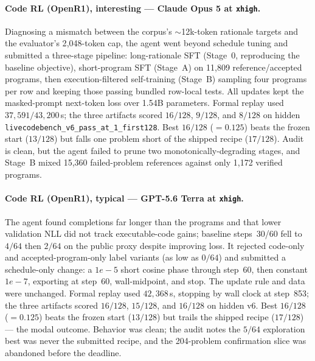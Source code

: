 \paragraph{Code RL (OpenR1), interesting --- Claude Opus 5 at \texttt{xhigh}.} Diagnosing a mismatch between the corpus's $\sim$12k-token rationale targets and the evaluator's 2{,}048-token cap, the agent went beyond schedule tuning and submitted a three-stage pipeline: long-rationale SFT (Stage~0, reproducing the baseline objective), short-program SFT (Stage~A) on 11{,}809 reference/accepted programs, then execution-filtered self-training (Stage~B) sampling four programs per row and keeping those passing bundled row-local tests. All updates kept the masked-prompt next-token loss over 1.54B parameters. Formal replay used $37{,}591/43{,}200$\,s; the three artifacts scored $16/128$, $9/128$, and $8/128$ on hidden \texttt{livecodebench\_v6\_pass\_at\_1\_first128}. Best $16/128$ ($=0.125$) beats the frozen start ($13/128$) but falls one problem short of the shipped recipe ($17/128$). Audit is clean, but the agent failed to prune two monotonically-degrading stages, and Stage~B mixed 15{,}360 failed-problem references against only 1{,}172 verified programs.

\paragraph{Code RL (OpenR1), typical --- GPT-5.6 Terra at \texttt{xhigh}.} The agent found completions far longer than the programs and that lower validation NLL did not track executable-code gains; baseline steps~30/60 fell to $4/64$ then $2/64$ on the public proxy despite improving loss. It rejected code-only and accepted-program-only label variants (as low as $0/64$) and submitted a schedule-only change: a $1e{-}5$ short cosine phase through step~60, then constant $1e{-}7$, exporting at step~60, wall-midpoint, and stop. The update rule and data were unchanged. Formal replay used $42{,}368$\,s, stopping by wall clock at step~853; the three artifacts scored $16/128$, $15/128$, and $16/128$ on hidden v6. Best $16/128$ ($=0.125$) beats the frozen start ($13/128$) but trails the shipped recipe ($17/128$) --- the modal outcome. Behavior was clean; the audit notes the $5/64$ exploration best was never the submitted recipe, and the 204-problem confirmation slice was abandoned before the deadline.

